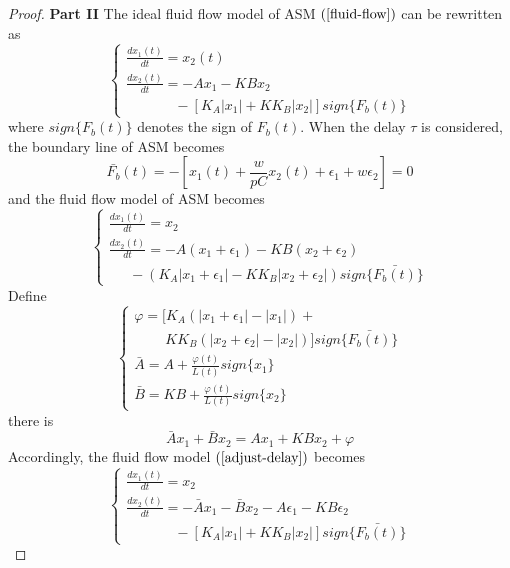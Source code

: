 \documentclass{sig-alternate-10pt}
\begin{document}
\begin{proof}
\textbf{Part II}
The ideal fluid flow model of ASM $(\ref{fluid-flow})$ can be rewritten as
\begin{equation}
\left \{ \begin{array}{l}
    \frac{dx_1(t)}{dt}=x_2(t) \\
    \frac{dx_2(t)}{dt}=-A x_1-KB x_2 \\
\quad\quad\quad\ \  -[K_A|x_1|+KK_B|x_2|]sign\{F_b(t)\}
\end{array}
    \right.
\label{adjust-basic}
\end{equation}
where $sign\{F_b(t)\}$ denotes the sign of $F_b(t)$. When the delay $\tau$ is considered, the boundary line of ASM becomes
\begin{equation}
\bar{F_b}(t)=-[x_1(t)+\frac{w}{pC}x_2(t)+\epsilon_1+w\epsilon_2]=0\label{switching}
\end{equation}
and the fluid flow model of ASM becomes
\begin{equation}
\left \{
\begin{array}{l}
\frac{dx_1(t)}{dt}=x_2 \\
\frac{dx_2(t)}{dt}=-A(x_1+\epsilon_1)-KB(x_2+\epsilon_2)\\  \quad\ \ -(K_A|x_1+\epsilon_1|-KK_B |x_2+\epsilon_2|)sign\{\bar{F_b(t)}\}
\end{array}
\right.
\label{adjust-delay}
\end{equation}
Define
\begin{equation}
\left \{
\begin{array}{l}
\varphi=[K_A(|x_1+\epsilon_1|-|x_1|)+ \\
\quad\ \quad  KK_B(|x_2+\epsilon_2|-|x_2|)]sign\{\bar{F_b(t)}\} \\ \bar{A}=A+\frac{\varphi(t)}{L(t)}sign\{x_1\} \\
\bar{B}=KB+\frac{\varphi(t)}{L(t)}sign\{x_2\}    \end{array}
\right.
\label{drift}
\end{equation}
there is
\begin{equation}
\bar{A}x_1+\bar{B}x_2=A x_1+KB x_2+\varphi    \end{equation}
Accordingly, the fluid flow model $(\ref{adjust-delay})$ becomes
\begin{equation}
\left \{
\begin{array}{l}
\frac{dx_1(t)}{dt}=x_2 \\
\frac{dx_2(t)}{dt}=-\bar{A}x_1-\bar{B}x_2 -A\epsilon_1 -KB\epsilon_2\\
\quad\quad\quad\ \  -[K_A|x_1|+KK_B |x_2|]sign\{\bar{F_b(t)}\}

\end{array}
\end{equation}
\end{proof}
\end{document}
